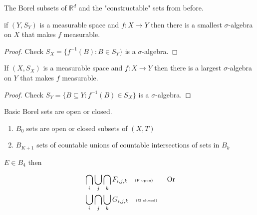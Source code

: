 The Borel subsets of $\mathbb{R}^d$ and the "constructable" sets from before.

\begin{theorem}
	if $(Y, S_Y)$ is a measurable space and $f: X \to Y$ then there is a smallest $\sigma$-algebra on $X$ that makes $f$ measurable.
\end{theorem}
\begin{proof}
	Check $S_X = \{f^{-1}(B) : B \in S_Y\}$ is a $\sigma$-algebra.
\end{proof}

\begin{theorem}
	If $(X, S_X)$ is a measurable space and $f:X \to Y$ then there is a largest $\sigma$-algebra on $Y$ that makes $f$ measurable.
\end{theorem}

\begin{proof}
	Check $S_Y = \{B \subseteq Y: f^{-1}(B) \in S_X \}$ is a $\sigma$-algebra.
\end{proof}

\begin{definition}
	Basic Borel sets are open or closed.
	\begin{enumerate}
		\item $B_0$ sets are open or closed subsets of $(X,T)$
		\item $B_{K+1}$ sets of countable unions of countable intersections of sets in $B_k$
	\end{enumerate}
\end{definition}

\begin{example}
	$E \in B_4$ then

	 \begin{align*}
		 &\bigcap_i \bigcup_j \bigcap_k F_{i,j,k} \quad \text{\tiny (F open)} \qquad \text{Or} \\
		 &\bigcup_i \bigcap_j \bigcup_k G_{i,j,k} \quad \text{\tiny (G closed)}
	\end{align*}
	
\end{example}

